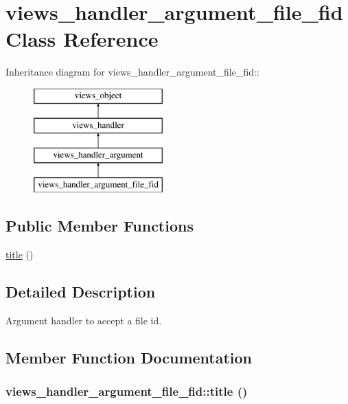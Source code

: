 \hypertarget{classviews__handler__argument__file__fid}{
\section{views\_\-handler\_\-argument\_\-file\_\-fid Class Reference}
\label{classviews__handler__argument__file__fid}
}
Inheritance diagram for views\_\-handler\_\-argument\_\-file\_\-fid::\begin{figure}[H]
\begin{center}
\leavevmode
\includegraphics[height=4cm]{classviews__handler__argument__file__fid}
\end{center}
\end{figure}
\subsection*{Public Member Functions}
\begin{CompactItemize}
\item 
\hyperlink{classviews__handler__argument__file__fid_b6dbcee36a0d890e870b01259f8ed35e}{title} ()
\end{CompactItemize}


\subsection{Detailed Description}
Argument handler to accept a file id. 

\subsection{Member Function Documentation}
\hypertarget{classviews__handler__argument__file__fid_b6dbcee36a0d890e870b01259f8ed35e}{
\subsubsection[{title}]{\setlength{\rightskip}{0pt plus 5cm}views\_\-handler\_\-argument\_\-file\_\-fid::title ()}}
\label{classviews__handler__argument__file__fid_b6dbcee36a0d890e870b01259f8ed35e}


